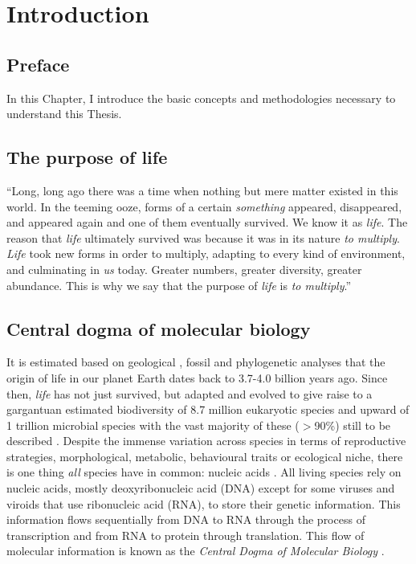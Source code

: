 \chapter{Introduction}

\section*{Preface}

In this Chapter, I introduce the basic concepts and methodologies necessary to understand this Thesis.

\section{The purpose of life}

``Long, long ago there was a time when nothing but mere matter existed in this world. In the teeming ooze, forms of a certain \textit{something} appeared, disappeared, and appeared again and one of them eventually survived. We know it as \textit{life}. The reason that \textit{life} ultimately survived was because it was in its nature \textit{to multiply}. \textit{Life} took new forms in order to multiply, adapting to every kind of environment, and culminating in \textit{us} today. Greater numbers, greater diversity, greater abundance. This is why we say that the purpose of \textit{life} is \textit{to multiply}.'' \cite{ISAYAMA_2021}

\section{Central dogma of molecular biology}

It is estimated based on geological \cite{SCHIDLOWSKI_1979_LIFE}, fossil \cite{SCHOPF_2007_LIFE} and phylogenetic \cite{BETTS_2018_LIFE} analyses that the origin of life in our planet Earth dates back to 3.7-4.0 billion years ago. Since then, \textit{life} has not just survived, but adapted and evolved to give raise to a gargantuan estimated biodiversity of 8.7 million eukaryotic species \cite{MORA_2011_SPECIES} and upward of 1 trillion microbial species \cite{HUG_2016_SPECIES, LOCEY_2016_SPECIES} with the vast majority of these ($>$90\%) still to be described \cite{COSTELLO_2013_SPECIES}. Despite the immense variation across species in terms of reproductive strategies, morphological, metabolic, behavioural traits or ecological niche, there is one thing \textit{all} species have in common: nucleic acids \cite{KOONIN_2011_LIFE}. All living species rely on nucleic acids, mostly deoxyribonucleic acid (DNA) except for some viruses \cite{KOONIN_2006_VIRUS} and viroids \cite{NAVARRO_2021_VIROIDS} that use ribonucleic acid (RNA), to store their genetic information. This information flows sequentially from DNA to RNA through the process of transcription and from RNA to protein through translation. This flow of molecular information is known as the \textit{Central Dogma of Molecular Biology} \cite{CRICK_1958_DOGMA, CRICK_1970_DOGMA}.


